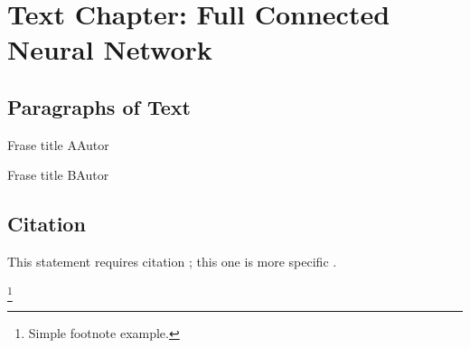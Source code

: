 \chapter{Text Chapter: Full Connected Neural Network}

\section{Paragraphs of Text}

\lipsum[1][1-3] 

\begin{informationbox}[Título A]
\lipsum[1][1-3] 
\end{informationbox}

\lipsum[1][1-3]


\begin{phrasebox}{Frase title A}{Autor}
\lipsum[1][1-3] 
\end{phrasebox}

\begin{phrasebox}{Frase title B}{Autor}
\lipsum[1][1-3] 
\end{phrasebox}

\lipsum[1][1-3] 

\begin{citationbox}
\lipsum[1][1-3] 
\end{citationbox}

\section{Citation}

This statement requires citation \cite{book_key}; this one is more specific \cite[122]{article_key}.

\lipsum[1] %

\begin{informationbox}[Título B]
\lipsum[1][1-3]\footnote{Simple footnote example.}
\end{informationbox}

\lipsum[1] %

\begin{elaborationbox}[Título C]
\lipsum[1][1-3] 
\end{elaborationbox}

